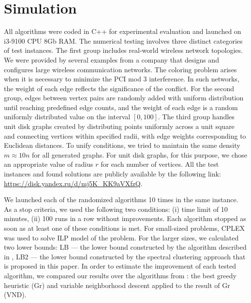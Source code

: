 \documentclass[runningheads]{llncs}
\begin{document}
\section{Simulation}

All algorithms were coded in C++ for experimental evaluation and launched on i3-9100 CPU 8Gb RAM. The numerical testing involves three distinct categories of test instances. The first group includes real-world wireless network topologies. We were provided by several examples from a company that designs and configures large wireless communication networks. The coloring problem arises when it is necessary to minimize the PCI mod 3 interference. In such networks, the weight of each edge reflects the significance of the conflict. For the second group, edges between vertex pairs are randomly added with uniform distribution until reaching predefined edge counts, and the weight of each edge is a random uniformly distributed value on the interval $\left[0 ,100 \right]$. The third group handles unit disk graphs created by distributing points uniformly across a unit square and connecting vertices within specified radii, with edge weights corresponding to Euclidean distances. To unify conditions, we tried to maintain the same density $m \approx 10n$ for all generated graphs. For unit disk graphs, for this purpose, we chose an appropriate value of radius $r$ for each number of vertices. All the test instances and found solutions are publicly available by the following link: \url{https://disk.yandex.ru/d/mj5K_KK9aVXfzQ}.

We launched each of the randomized algorithms 10 times in the same instance. As a stop criteria, we used the following two conditions: (i) time limit of 10 minutes, (ii) 100 runs in a row without improvements. Each algorithm stopped as soon as at least one of these conditions is met. For small-sized problems, CPLEX was used to solve ILP model of the problem. For the larger sizes, we calculated two lower bounds: LB — the lower bound constructed by the algorithm described in \cite{Erzin:24}, LB2 — the lower bound constructed by the spectral clustering approach that is proposed in this paper. In order to estimate the improvement of each tested algorithm, we compared our results over the algorithms from \cite{Erzin:24}: the best greedy heuristic (Gr) and variable neighborhood descent applied to the result of Gr (VND).
\end{document}
